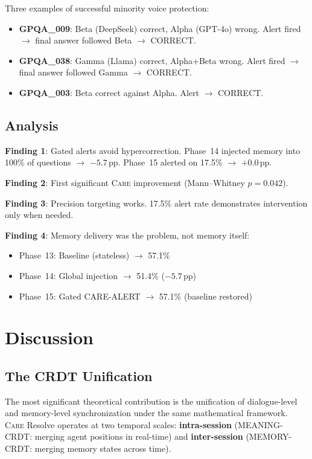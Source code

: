 \documentclass[11pt,a4paper]{article}
\newcommand{\care}{\textsc{Care}\xspace}
\newcommand{\pp}{\,pp\xspace}
\begin{document}
Three examples of successful minority voice protection:
\begin{itemize}
  \item \textbf{GPQA\_009}: Beta (DeepSeek) correct, Alpha (GPT-4o)
    wrong.  Alert fired $\to$ final answer followed Beta $\to$ CORRECT.
  \item \textbf{GPQA\_038}: Gamma (Llama) correct, Alpha+Beta wrong.
    Alert fired $\to$ final answer followed Gamma $\to$ CORRECT.
  \item \textbf{GPQA\_003}: Beta correct against Alpha.  Alert $\to$
    CORRECT.
\end{itemize}

\subsection{Analysis}

\textbf{Finding 1}: Gated alerts avoid hypercorrection.  Phase~14
injected memory into 100\% of questions $\to$ $-5.7$\pp.  Phase~15
alerted on 17.5\% $\to$ $+0.0$\pp.

\textbf{Finding 2}: First significant \care improvement
(Mann--Whitney $p = 0.042$).

\textbf{Finding 3}: Precision targeting works.  17.5\% alert rate
demonstrates intervention only when needed.

\textbf{Finding 4}: Memory delivery was the problem, not memory itself:
\begin{itemize}
  \item Phase~13: Baseline (stateless) $\to$ 57.1\%
  \item Phase~14: Global injection $\to$ 51.4\% ($-5.7$\pp)
  \item Phase~15: Gated CARE-ALERT $\to$ 57.1\% (baseline restored)
\end{itemize}

\section{Discussion}\label{sec:discussion}

\subsection{The CRDT Unification}

The most significant theoretical contribution is the unification of
dialogue-level and memory-level synchronization under the same
mathematical framework.  \care Resolve operates at two temporal scales:
\textbf{intra-session} (MEANING-CRDT: merging agent positions in
real-time) and \textbf{inter-session} (MEMORY-CRDT: merging memory
states across time).
\end{document}
